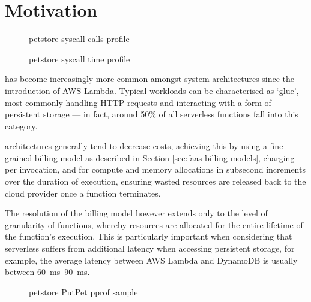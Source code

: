 \section{Motivation}
\begin{figure}
    \begin{center}
        
    \end{center}
    \caption{\faas{} petstore syscall calls profile}
\end{figure}

\begin{figure}
    \begin{center}
        
    \end{center}
    \caption{\faas{} petstore syscall time profile}
\end{figure}

\faaslong{} has become increasingly more common amongst system architectures since the introduction of AWS Lambda\cite{amazonAWSLambda2024}. Typical \faas{} workloads can be characterised as `glue', most commonly handling HTTP requests and interacting with a form of persistent storage --- in fact, around 50\% of all serverless functions fall into this category\cite{eismannReviewServerlessUse2020}.

\faas{} architectures generally tend to decrease costs, achieving this by using a fine-grained billing model as described in Section \ref{sec:faas-billing-models}, charging per invocation, and for compute and memory allocations in subsecond increments over the duration of execution, ensuring wasted resources are released back to the cloud provider once a function terminates.

The resolution of the billing model however extends only to the level of granularity of functions, whereby resources are allocated for the entire lifetime of the function's execution. This is particularly important when considering that serverless suffers from additional latency when accessing persistent storage, for example, the average latency between AWS Lambda and DynamoDB is usually between \qtyrange{60}{90}{\ms}\cite{ghoshCachingTechniquesImprove2020}.

\begin{figure*}
    \begin{center}
        \begin{tikzpicture}[scale = 0.75, every node/.style={scale=0.75}]
            
        \end{tikzpicture}
    \end{center}
    \caption{\faas{} petstore PutPet pprof sample}
\end{figure*}

